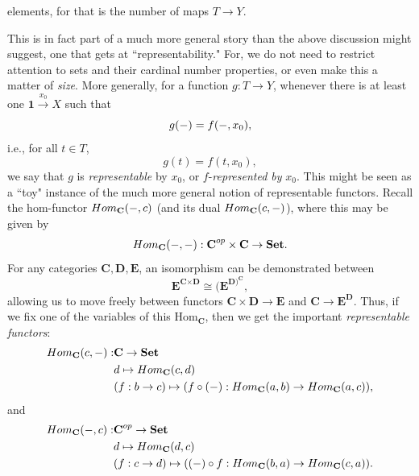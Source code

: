 \documentclass[a4paper]{book}
\theoremstyle{definition}
\theoremstyle{definition}
\theoremstyle{definition}
\theoremstyle{theorem}
\theoremstyle{definition}
\begin{document}
elements, for that is the number of maps $T \rightarrow Y$. \par 
This is in fact part of a much more general story than the above discussion might suggest, one that gets at ``representability." For, we do not need to restrict attention to sets and their cardinal number properties, or even make this a matter of \textit{size}. More generally, for a function $g: T \rightarrow Y$, whenever there is at least one $\textbf{1} \xrightarrow{x_0} X$ such that 
\begin{equation*}
g(\--) = f(\--, x_0),
\end{equation*}  
i.e., for all $t \in T$, 
\begin{equation*}
g(t) = f(t, x_0),
\end{equation*} we say that $g$ is \textit{representable} by $x_0$, or $f$-\textit{represented by} $x_0$. This might be seen as a ``toy" instance of the much more general notion of representable functors. Recall the hom-functor $Hom_{\textbf{C}}(\--, c)$ (and its dual $Hom_{\textbf{C}}(c, \--)$), where this may be given by 
\begin{equation*}
Hom_{\textbf{C}}(\--, \--): \textbf{C}^{op} \times \textbf{C} \rightarrow \textbf{Set}. 
\end{equation*}
For any categories $\textbf{C}, \textbf{D}, \textbf{E}$, an isomorphism can be demonstrated between 
\begin{equation*}
\textbf{E}^{\textbf{C} \times \textbf{D}} \cong (\textbf{E}^{\textbf{D})^{\textbf{C}}},
\end{equation*}
allowing us to move freely between functors $\textbf{C} \times \textbf{D} \rightarrow \textbf{E}$ and $\textbf{C} \rightarrow \textbf{E}^{\textbf{D}}$. Thus, if we fix one of the variables of this Hom$_{\textbf{C}}$, then we get the important \textit{representable functors}: 
\begin{align*} 
Hom_{\textbf{C}}(c, \--) : & \textbf{C} \rightarrow \textbf{Set} \\ 
& d \mapsto Hom_{\textbf{C}}(c, d) \\ 
& (f: b \rightarrow c) \mapsto (f \circ (\--): Hom_{\textbf{C}}(a,b) \rightarrow Hom_{\textbf{C}}(a,c)),
\end{align*} 
and 
\begin{align*} 
Hom_{\textbf{C}}(\--, c) : & \textbf{C}^{op} \rightarrow \textbf{Set} \\ 
& d \mapsto Hom_{\textbf{C}}(d, c) \\ 
& (f: c \rightarrow d) \mapsto ((\--) \circ f: Hom_{\textbf{C}}(b,a) \rightarrow Hom_{\textbf{C}}(c,a)).
\end{align*} 
\end{document}
